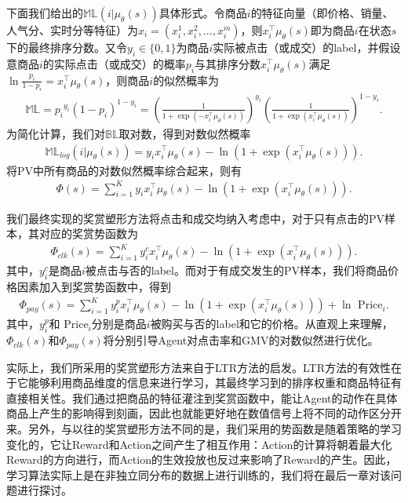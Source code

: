 下面我们给出的$\mathbb{M}\mathbb{L}(i|\mu_{\theta}(s))$具体形式。令商品$i$的特征向量（即价格、销量、人气分、实时分等特征）为$x_i = (x^1_i, x^2_i, ..., x^m_i)$，则$x_i^{\top} \mu_{\theta}(s)$即为商品$i$在状态$s$下的最终排序分数。又令$y_i \in \{ 0, 1 \}$为商品$i$实际被点击（或成交）的label，并假设意商品$i$的实际点击（或成交）的概率$p_i$与其排序分数$x_i^{\top} \mu_{\theta}(s)$满足$\ln{\frac{p_i}{1-p_i}} =  x_i^{\top} \mu_{\theta}(s)$，则商品$i$的似然概率为
\begin{align}
 \mathbb{M}\mathbb{L} = {p_i}^{y_i} (1-p_i)^{1-y_i} = (\frac{1}{1+\exp(-x_i^{\top} \mu_{\theta}(s))})^{y_i} (\frac{1}{1+\exp(x_i^{\top} \mu_{\theta}(s))})^{1-y_i}. 
\end{align}
 为简化计算，我们对$\mathbb{B}\mathbb{L}$取对数，得到对数似然概率
\begin{align}
 \mathbb{M}\mathbb{L}_{log}(i|\mu_{\theta}(s)) = y_i x_i^{\top} \mu_{\theta}(s) - \ln(1+\exp(x_i^{\top} \mu_{\theta}(s))). 
\end{align}
 将PV中所有商品的对数似然概率综合起来，则有
\begin{align}
 \Phi(s) = \sum_{i=1}^K y_i x_i^{\top} \mu_{\theta}(s) - \ln(1+\exp(x_i^{\top} \mu_{\theta}(s))). 
\end{align}


我们最终实现的奖赏塑形方法将点击和成交均纳入考虑中，对于只有点击的PV样本，其对应的奖赏势函数为
\begin{align}
 \Phi_{clk}(s) = \sum_{i=1}^K y^c_i x_i^{\top} \mu_{\theta}(s) - \ln(1+\exp(x_i^{\top} \mu_{\theta}(s))). 
\end{align}
 其中，$y^c_i$是商品$i$被点击与否的label。而对于有成交发生的PV样本，我们将商品价格因素加入到奖赏势函数中，得到
\begin{align}
 \Phi_{pay}(s) = \sum_{i=1}^K y^p_i x_i^{\top} \mu_{\theta}(s) - \ln(1+\exp(x_i^{\top} \mu_{\theta}(s))) + \ln \text{ Price}_i. 
\end{align}
 其中，$y^p_i$和$\text{ Price}_i$分别是商品$i$被购买与否的label和它的价格。从直观上来理解，$\Phi_{clk}(s)$和$\Phi_{pay}(s)$将分别引导Agent对点击率和GMV的对数似然进行优化。

实际上，我们所采用的奖赏塑形方法来自于LTR方法的启发。LTR方法的有效性在于它能够利用商品维度的信息来进行学习，其最终学习到的排序权重和商品特征有直接相关性。我们通过把商品的特征灌注到奖赏函数中，能让Agent的动作在具体商品上产生的影响得到刻画，因此也就能更好地在数值信号上将不同的动作区分开来。另外，与以往的奖赏塑形方法不同的是，我们采用的势函数是随着策略的学习变化的，它让Reward和Action之间产生了相互作用：Action的计算将朝着最大化Reward的方向进行，而Action的生效投放也反过来影响了Reward的产生。因此，学习算法实际上是在非独立同分布的数据上进行训练的，我们将在最后一章对该问题进行探讨。


